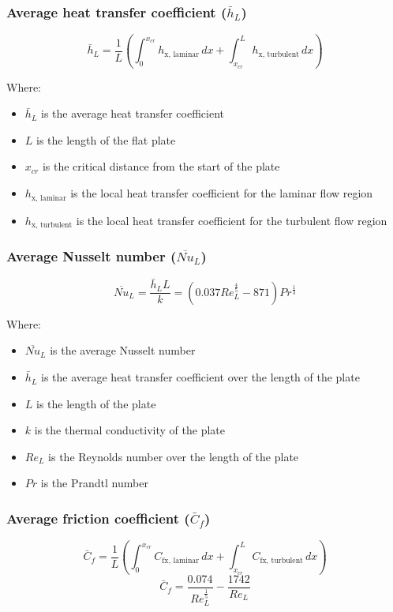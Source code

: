 \documentclass[11pt]{article}
\begin{document}
\subsubsection{Average heat transfer coefficient (\(\bar{h}_L\))}
\label{sec:org2c191b2}
\[\bar{h}_L = \frac{1}{L} \left(\int_0^{x_{cr}} h_{\text{x, laminar}} \, dx + \int_{x_{cr}}^L h_{\text{x, turbulent}} \, dx \right)\]

Where:
\begin{itemize}
\item \(\bar{h}_L\) is the average heat transfer coefficient
\item \(L\) is the length of the flat plate
\item \(x_{cr}\) is the critical distance from the start of the plate
\item \(h_{\text{x, laminar}}\) is the local heat transfer coefficient for the laminar flow region
\item \(h_{\text{x, turbulent}}\) is the local heat transfer coefficient for the turbulent flow region
\end{itemize}
\subsubsection{Average Nusselt number (\(\overline{Nu}_L\))}
\label{sec:orgc2470af}
\[\overline{Nu}_L = \frac{\bar{h}_L L}{k} = (0.037 Re_L^ \frac{4}{5} - 871) Pr^{\frac{1}{3}}\]

Where:
\begin{itemize}
\item \(\overline{Nu}_L\) is the average Nusselt number
\item \(\bar{h}_L\) is the average heat transfer coefficient over the length of the plate
\item \(L\) is the length of the plate
\item \(k\) is the thermal conductivity of the plate
\item \(Re_L\) is the Reynolds number over the length of the plate
\item \(Pr\) is the Prandtl number
\end{itemize}

 \newpage
\subsubsection{Average friction coefficient (\(\bar{C}_f\))}
\label{sec:org03dba6c}
\[\bar{C}_f = \frac{1}{L} \left(\int_0^{x_{cr}} C_{\text{fx, laminar}} \, dx + \int_{x_{cr}}^L C_{\text{fx, turbulent}} \, dx \right)\]
\[\bar{C}_f = \frac{0.074}{Re_L^{\frac{1}{5}}} - \frac{1742}{Re_L}\]
\end{document}
